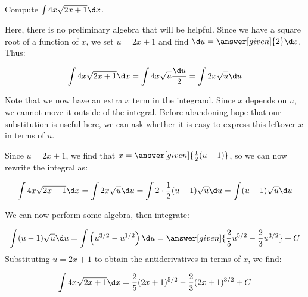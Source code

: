 \documentclass[nooutcomes]{ximera}
\begin{document}
\begin{example}
Compute $\int 4x \sqrt{2x+1} \d x$.

\begin{explanation}
Here, there is no preliminary algebra that will be helpful.  Since we have a square root of a function of $x$, we set $u=2x+1$ and find $\d u = \answer[given]{2} \d x$.  Thus:

\[
\int 4x \sqrt{2x+1} \d x = \int 4x \sqrt{u} \frac{\d u}{2} =  \int 2x \sqrt{u} \d u
\]

Note that we now have an extra $x$ term in the integrand.  Since $x$ depends on $u$, we cannot move it outside of the integral.  Before abandoning hope that our substitution is useful here, we can ask whether it is easy to express this leftover $x$ in terms of $u$.  

Since $u= 2x+1$, we find that $x = \answer[given]{\frac{1}{2}(u-1)}$, so we can now rewrite the integral as:

\[
\int 4x \sqrt{2x+1} \d x =  \int 2x \sqrt{u} \d u = \int 2 \cdot \frac{1}{2}(u-1) \sqrt{u} \d u = \int (u-1)\sqrt{u} \d u
\]

We can now perform some algebra, then integrate:

\[
 \int (u-1)\sqrt{u} \d u = \int \left(u^{3/2} - u^{1/2} \right) \d u = \answer[given]{\frac{2}{5} u^{5/2} - \frac{2}{3} u^{3/2}} +C
\]
Substituting $u=2x+1$ to obtain the antiderivatives in terms of $x$, we find:

\[
\int 4x \sqrt{2x+1} \d x =  \frac{2}{5} (2x+1)^{5/2} - \frac{2}{3} (2x+1)^{3/2} +C
\]
\end{explanation}
\end{example}
\end{document}
